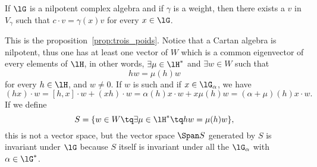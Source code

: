 \begin{lemma}
	If $\lG$ is a nilpotent complex algebra and if $\gamma$ is a weight, then there exists a $v$ in $V_{\gamma}$ such that $c\cdot v=\gamma(x)v$ for every $x\in\lG$.
\end{lemma}
This is the proposition~\ref{prop:trois_poids}. Notice that a Cartan algebra is nilpotent, thus one has at least one vector of $W$ which is a common eigenvector of every elements of $\lH$, in other words, $\exists\mu\in\lH^*$ and $\exists w\in W$ such that
\begin{equation}
	hw=\mu(h)w
\end{equation}
for every $h\in\lH$, and $w\neq 0$. If $w$ is such and if $x\in\lG_{\alpha}$, we have
\begin{equation}
	(hx)\cdot w=[h,x]\cdot w+(xh)\cdot w=\alpha(h)x\cdot w+x\mu(h)w=(\alpha+\mu)(h)x\cdot w.
\end{equation}
If we define
\begin{equation}
	S=\{ w\in W\tq\exists\mu\in\lH^*\tq hw=\mu(h)w \},
\end{equation}
this is not a vector space, but the vector space $\Span S$ generated by $S$ is invariant under $\lG$ because $S$ itself is invariant under all the $\lG_{\alpha}$ with $\alpha\in\lG^*$.

